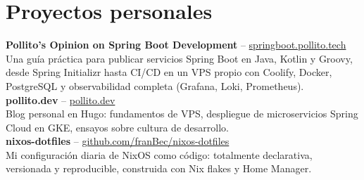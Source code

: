 \documentclass[10pt, a4paper]{article}
\begin{document}
\section{Proyectos personales}
\textbf{Pollito's Opinion on Spring Boot Development} -- \href{https://springboot.pollito.tech/}{springboot.pollito.tech} \\
Una guía práctica para publicar servicios Spring Boot en Java, Kotlin y Groovy, desde Spring Initializr hasta CI/CD en un VPS propio con Coolify, Docker, PostgreSQL y observabilidad completa (Grafana, Loki, Prometheus). \\[2pt]
\textbf{pollito.dev} -- \href{https://pollito.dev/}{pollito.dev} \\
Blog personal en Hugo: fundamentos de VPS, despliegue de microservicios Spring Cloud en GKE, ensayos sobre cultura de desarrollo. \\[2pt]
\textbf{nixos-dotfiles} -- \href{https://github.com/franBec/nixos-dotfiles}{github.com/franBec/nixos-dotfiles} \\
Mi configuración diaria de NixOS como código: totalmente declarativa, versionada y reproducible, construida con Nix flakes y Home Manager.
\end{document}
